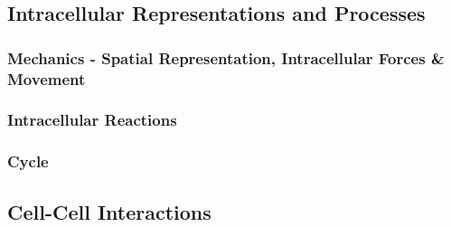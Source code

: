 \documentclass{article}
\begin{document}
\subsection{Intracellular Representations and Processes}
\label{subsec:abstractions-cell}
\subsubsection{Mechanics - Spatial Representation, Intracellular Forces \& Movement}
\label{subsubsec:abstractions-cell-mechanics}
\subsubsection{Intracellular Reactions}
\label{subsubsec:abstractions-cell-reactions}
\subsubsection{Cycle}
\label{subsubsec:abstractions-cell-cycle}

\subsection{Cell-Cell Interactions}
\label{subsec:abstractions-cell-cell}
\end{document}

